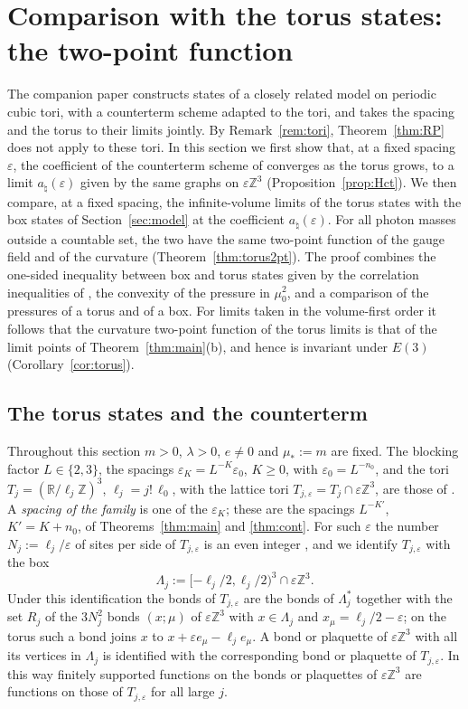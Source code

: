 \documentclass[11pt]{amsart}
\theoremstyle{plain}
\theoremstyle{definition}
\theoremstyle{remark}
\numberwithin{equation}{section}
\newcommand{\R}{\mathbb{R}}
\newcommand{\Z}{\mathbb{Z}}
\newcommand{\eps}{\varepsilon}
\newcommand{\Eu}{E(3)}
\begin{document}
\section{Comparison with the torus states: the two-point function}\label{sec:torus}

The companion paper \cite{v1} constructs states of a closely related model on periodic cubic tori, with a counterterm scheme adapted to the tori, and takes the spacing and the torus to their limits jointly. By Remark~\ref{rem:tori}, Theorem~\ref{thm:RP} does not apply to these tori. In this section we first show that, at a fixed spacing $\eps$, the coefficient of the counterterm scheme of \cite{v1} converges as the torus grows, to a limit $a_\natural(\eps)$ given by the same graphs on $\eps\Z^3$ (Proposition~\ref{prop:Hct}). We then compare, at a fixed spacing, the infinite-volume limits of the torus states with the box states of Section~\ref{sec:model} at the coefficient $a_\natural(\eps)$. For all photon masses outside a countable set, the two have the same two-point function of the gauge field and of the curvature (Theorem~\ref{thm:torus2pt}). The proof combines the one-sided inequality between box and torus states given by the correlation inequalities of \cite{BFS1}, the convexity of the pressure in $\mu_0^2$, and a comparison of the pressures of a torus and of a box. For limits taken in the volume-first order it follows that the curvature two-point function of the torus limits is that of the limit points of Theorem~\ref{thm:main}(b), and hence is invariant under $\Eu$ (Corollary~\ref{cor:torus}).

\subsection{The torus states and the counterterm}\label{ssec:tor-states}
Throughout this section $m>0$, $\lambda>0$, $e\ne0$ and $\mu_*:=m$ are fixed. The blocking factor $L\in\{2,3\}$, the spacings $\eps_K=L^{-K}\eps_0$, $K\ge0$, with $\eps_0=L^{-n_0}$, and the tori $T_j=(\R/\ell_j\Z)^3$, $\ell_j=j!\,\ell_0$, with the lattice tori $T_{j,\eps}=T_j\cap\eps\Z^3$, are those of \cite[Sect.~2.1]{v1}. A \emph{spacing of the family} is one of the $\eps_K$; these are the spacings $L^{-K'}$, $K'=K+n_0$, of Theorems~\ref{thm:main} and \ref{thm:cont}. For such $\eps$ the number $N_j:=\ell_j/\eps$ of sites per side of $T_{j,\eps}$ is an even integer \cite[Lemma~2.1]{v1}, and we identify $T_{j,\eps}$ with the box
\[
\Lambda_j:=[-\ell_j/2,\ell_j/2)^3\cap\eps\Z^3 .
\]
Under this identification the bonds of $T_{j,\eps}$ are the bonds of $\Lambda_j^*$ together with the set $R_j$ of the $3N_j^2$ bonds $(x;\mu)$ of $\eps\Z^3$ with $x\in\Lambda_j$ and $x_\mu=\ell_j/2-\eps$; on the torus such a bond joins $x$ to $x+\eps e_\mu-\ell_je_\mu$. A bond or plaquette of $\eps\Z^3$ with all its vertices in $\Lambda_j$ is identified with the corresponding bond or plaquette of $T_{j,\eps}$. In this way finitely supported functions on the bonds or plaquettes of $\eps\Z^3$ are functions on those of $T_{j,\eps}$ for all large $j$.
\end{document}
